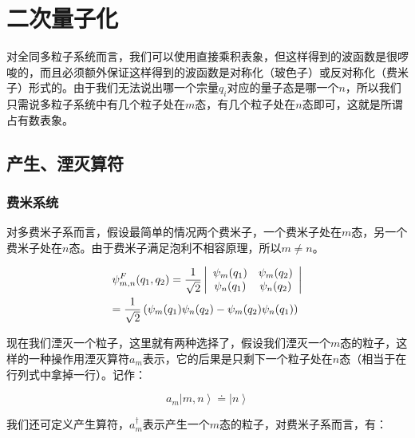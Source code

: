 \section{二次量子化}

对全同多粒子系统而言，我们可以使用直接乘积表象，但这样得到的波函数是很啰唆的，而且必须额外保证这样得到的波函数是对称化（玻色子）或反对称化（费米子）形式的。由于我们无法说出哪一个宗量$q_i$对应的量子态是哪一个$n$，所以我们只需说多粒子系统中有几个粒子处在$m$态，有几个粒子处在$n$态即可，这就是所谓占有数表象。


\subsection{产生、湮灭算符}


\subsubsection{费米系统}

对多费米子系而言，假设最简单的情况两个费米子，一个费米子处在$m$态，另一个费米子处在$n$态。由于费米子满足泡利不相容原理，所以$
m \ne n$。

\begin{equation}\label{two fermions wave function}
\begin{gathered}
\psi _{m,n}^F (q_1 ,q_2 ) = \frac{1} {{\sqrt 2 }}\left|
{\begin{array}{*{20}c}
   {\psi _m (q_1 )} & {\psi _m (q_2 )}  \\
   {\psi _n (q_1 )} & {\psi _n (q_2 )}  \\
\end{array} } \right| \hfill \\
= \frac{1}{{\sqrt 2 }}\left( {\psi _m (q_1
)\psi _n (q_2 ) - \psi _m (q_2 )\psi _n (q_1 )} \right) \hfill \\
\end{gathered}
\end{equation}


现在我们湮灭一个粒子，这里就有两种选择了，假设我们湮灭一个$m$态的粒子，这样的一种操作用湮灭算符$a_m$表示，它的后果是只剩下一个粒子处在$n$态（相当于在行列式中拿掉一行）。记作：

\begin{equation}\label{ferminon anni}
a_m \left| {m,n} \right\rangle  \doteq \left| n \right\rangle
\end{equation}


我们还可定义产生算符，$a_m^{\dagger}$表示产生一个$m$态的粒子，对费米子系而言，有：


